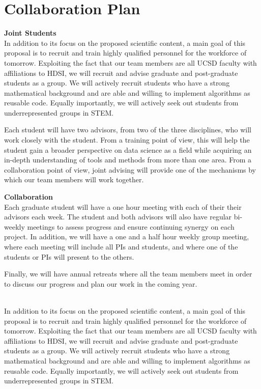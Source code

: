 \documentclass{article}
\begin{document}
\section{Collaboration Plan}

{\bf Joint Students}\\
  In
addition to its focus on the proposed scientific content, a main goal
of this proposal is to recruit and train highly qualified personnel
for the workforce of tomorrow. Exploiting the fact that our team
members are all UCSD faculty with affiliations to HDSI, we will
recruit and advise graduate and post-graduate students as a group. We
will actively recruit students who have a strong mathematical
background and are able and willing to implement algorithms as
reusable code. Equally importantly, we will actively seek out students
from underrepresented groups in STEM.

Each student will have two advisors, from two of the three
disciplines, who will work closely with the student. From a training
point of view, this will help the student gain a broader perspective
on data science as a field while acquiring an in-depth understanding
of tools and methods from more than one area. From a collaboration
point of view, joint advising will provide one of the mechanisms by
which our team members will work together.

{\bf Collaboration}\\   Each
graduate student will have a one hour meeting with each of their their
advisors each week. The student and both advisors will also have
regular bi-weekly meetings to assess progress and ensure continuing
synergy on each project.  In addition, we will have a one and a half
hour weekly group meeting, where each meeting will include all PIs and
students, and where one of the students or PIs will present to the
others.

Finally, we will have annual retreats where all the team members meet
in order to discuss our progress and plan our work in the coming year.

\\
In addition to its focus on the proposed scientific content, a main goal of this proposal is to recruit and train highly qualified personnel for the workforce of tomorrow. Exploiting the fact that our team members are all UCSD faculty with affiliations to HDSI, we will recruit and advise graduate and post-graduate students as a
group. We will actively recruit students who have a strong
mathematical background and are able and willing to implement
algorithms as reusable code. Equally importantly, we will actively seek out students from underrepresented groups in STEM. 
\end{document}
